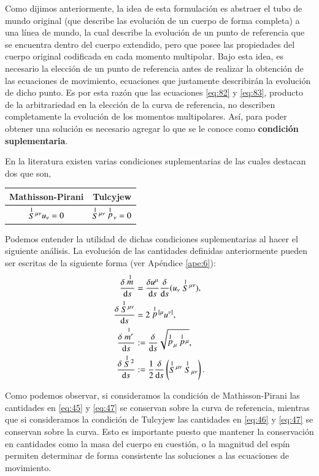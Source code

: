Como dijimos anteriormente, la idea de esta formulación es abstraer el tubo de mundo original (que describe las evolución de un cuerpo de forma completa) a una línea de mundo, la cual describe la evolución de un punto de referencia que se encuentra dentro del cuerpo extendido, pero que posee las propiedades del cuerpo original codificada en cada momento multipolar. Bajo esta idea, es necesario la elección de un punto de referencia antes de realizar la obtención de las ecuaciones de movimiento, ecuaciones que justamente describirán la evolución de dicho punto. Es por esta razón que las ecuaciones \eqref{eq:82} y \eqref{eq:83}, producto de la arbitrariedad en la elección de la curva de referencia, no describen completamente la evolución de los momentos multipolares. Así, para poder obtener una solución es necesario agregar lo que se le conoce como \textbf{condición suplementaria}.

En la literatura existen varias condiciones suplementarias de las cuales destacan dos que son,
\begin{center}
\begin{tabular}{cc}
\hline
Mathisson-Pirani & Tulcyjew \\
\hline \hline
$\stackrel{1}{S}{\!}^{\mu \nu} u_{\nu} = 0 $ & $\stackrel{1}{S}{\!}^{\mu \nu} \stackrel{1}{p}{\!}_{\nu} = 0 $ \\
\hline
\end{tabular}
\end{center}

Podemos entender la utilidad de dichas condiciones suplementarias al hacer el siguiente análisis. La evolución de las cantidades definidas anteriormente pueden ser escritas de la siguiente forma (ver Apéndice \ref{ape:6}):
\begin{align}
\label{eq:45}
\cd{\des{1}{m}} &= \cd{u^{\mu}} \cd{}(u_{\nu} \des{1}{S}^{\mu \nu}),\\
\label{eq:103}
\cd{\des{1}{S}^{\mu \nu}} &= 2 \des{1}{p}^{[\mu} u^{\nu]},\\
\label{eq:46}
\cd{\des{1}{m'}} &:= \cd{}\sqrt{\des{1}{p}_{\mu}\des{1}{p}^{\mu}},\\
\label{eq:47}
\cd{\des{1}{S}^2} &:= \frac{1}{2} \cd{} \left( \des{1}{S}^{\mu \nu} \des{1}{S}_{\mu \nu} \right).
\end{align}

Como podemos observar, si consideramos la condición de Mathisson-Pirani las cantidades en \eqref{eq:45} y \eqref{eq:47} se conservan sobre la curva de referencia, mientras que si consideramos la condición de Tulcyjew las cantidades en \eqref{eq:46} y \eqref{eq:47} se conservan sobre la curva. Esto es importante puesto que mantener la conservación en cantidades como la masa del cuerpo en cuestión, o la magnitud del espín permiten determinar de forma consistente las soluciones a las ecuaciones de movimiento.

